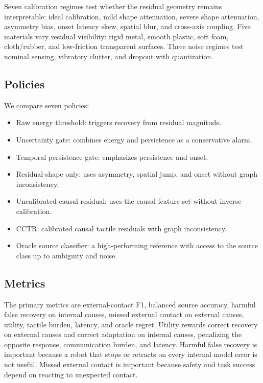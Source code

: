 \documentclass{article}
\newcommand{\method}{CCTR}
\begin{document}
Seven calibration regimes test whether the residual geometry remains interpretable: ideal calibration, mild shape attenuation, severe shape attenuation, asymmetry bias, onset latency skew, spatial blur, and cross-axis coupling. Five materials vary residual visibility: rigid metal, smooth plastic, soft foam, cloth/rubber, and low-friction transparent surfaces. Three noise regimes test nominal sensing, vibratory clutter, and dropout with quantization.

\subsection{Policies}

We compare seven policies:
\begin{itemize}
\item Raw energy threshold: triggers recovery from residual magnitude.
\item Uncertainty gate: combines energy and persistence as a conservative alarm.
\item Temporal persistence gate: emphasizes persistence and onset.
\item Residual-shape only: uses asymmetry, spatial jump, and onset without graph inconsistency.
\item Uncalibrated causal residual: uses the causal feature set without inverse calibration.
\item \method{}: calibrated causal tactile residuals with graph inconsistency.
\item Oracle source classifier: a high-performing reference with access to the source class up to ambiguity and noise.
\end{itemize}

\subsection{Metrics}

The primary metrics are external-contact F1, balanced source accuracy, harmful false recovery on internal causes, missed external contact on external causes, utility, tactile burden, latency, and oracle regret. Utility rewards correct recovery on external causes and correct adaptation on internal causes, penalizing the opposite response, communication burden, and latency. Harmful false recovery is important because a robot that stops or retracts on every internal model error is not useful. Missed external contact is important because safety and task success depend on reacting to unexpected contact.
\end{document}
